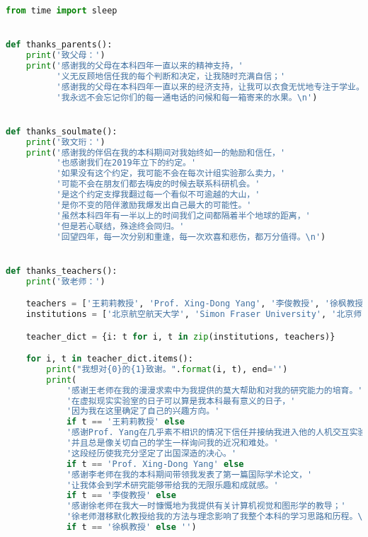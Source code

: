\lstset{style=mystyle}
\begin{lstlisting}[language=Python, frame=none]
from time import sleep


def thanks_parents():
    print('致父母：')
    print('感谢我的父母在本科四年一直以来的精神支持，'
          '义无反顾地信任我的每个判断和决定，让我随时充满自信；'
          '感谢我的父母在本科四年一直以来的经济支持，让我可以衣食无忧地专注于学业。'
          '我永远不会忘记你们的每一通电话的问候和每一箱寄来的水果。\n')


def thanks_soulmate():
    print('致文珩：')
    print('感谢我的伴侣在我的本科期间对我始终如一的勉励和信任，'
          '也感谢我们在2019年立下的约定。'
          '如果没有这个约定，我可能不会在每次计组实验那么卖力，'
          '可能不会在朋友们都去嗨皮的时候去联系科研机会。'
          '是这个约定支撑我翻过每一个看似不可逾越的大山，'
          '是你不变的陪伴激励我爆发出自己最大的可能性。'
          '虽然本科四年有一半以上的时间我们之间都隔着半个地球的距离，'
          '但是若心联结，殊途终会同归。'
          '回望四年，每一次分别和重逢，每一次欢喜和悲伤，都万分值得。\n')


def thanks_teachers():
    print('致老师：')

    teachers = ['王莉莉教授', 'Prof. Xing-Dong Yang', '李俊教授', '徐枫教授']
    institutions = ['北京航空航天大学', 'Simon Fraser University', '北京师范大学', '清华大学']

    teacher_dict = {i: t for i, t in zip(institutions, teachers)}

    for i, t in teacher_dict.items():
        print("我想对{0}的{1}致谢。".format(i, t), end='')
        print(
            '感谢王老师在我的漫漫求索中为我提供的莫大帮助和对我的研究能力的培育。'
            '在虚拟现实实验室的日子可以算是我本科最有意义的日子，'
            '因为我在这里确定了自己的兴趣方向。' 
            if t == '王莉莉教授' else
            '感谢Prof. Yang在几乎素不相识的情况下信任并接纳我进入他的人机交互实验室，'
            '并且总是像关切自己的学生一样询问我的近况和难处。'
            '这段经历使我充分坚定了出国深造的决心。' 
            if t == 'Prof. Xing-Dong Yang' else
            '感谢李老师在我的本科期间带领我发表了第一篇国际学术论文，'
            '让我体会到学术研究能够带给我的无限乐趣和成就感。' 
            if t == '李俊教授' else
            '感谢徐老师在我大一时慷慨地为我提供有关计算机视觉和图形学的教导；'
            '徐老师潜移默化教授给我的方法与理念影响了我整个本科的学习思路和历程。\n' 
            if t == '徐枫教授' else '')



\end{lstlisting}
